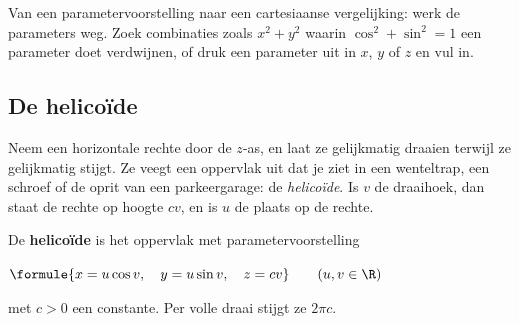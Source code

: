 
\begin{werkwijze}
Van een parametervoorstelling naar een cartesiaanse vergelijking: werk de parameters weg. Zoek combinaties zoals $x^2 + y^2$ waarin $\cos^2 + \sin^2 = 1$ een parameter doet verdwijnen, of druk een parameter uit in $x$, $y$ of $z$ en vul in.
\end{werkwijze}

\begin{oefeningen}
\end{oefeningen}

\subsection{De helicoïde}

Neem een horizontale rechte door de $z$-as, en laat ze gelijkmatig draaien terwijl ze gelijkmatig stijgt. Ze veegt een oppervlak uit dat je ziet in een wenteltrap, een schroef of de oprit van een parkeergarage: de \textit{helicoïde}. Is $v$ de draaihoek, dan staat de rechte op hoogte $cv$, en is $u$ de plaats op de rechte.

\begin{theorie}
\begin{minipage}[t]{.7\linewidth}
\vspace{0pt}
De \textbf{\textcolor{accent}{helicoïde}} is het oppervlak met parametervoorstelling

\vspace{1mm}
\qquad $\formule{x = u\cos v, \quad y = u\sin v, \quad z = cv} \qquad (u, v \in \R)$

\vspace{1mm}
met $c > 0$ een constante. Per volle draai stijgt ze $2\pi c$.
\end{minipage}\hfill
\begin{minipage}[t]{.26\linewidth}
\vspace{0pt}
\centering
{}
\end{minipage}
\end{theorie}


